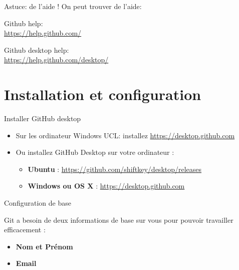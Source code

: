 \documentclass{beamer}
\begin{document}
\begin{frame}{Astuce: de l'aide !}
    On peut trouver de l'aide:
    
    \begin{center}
    	Github help:\\ \url{https://help.github.com/}
    \end{center}
    \begin{center}
        Github desktop help:\\ \url{https://help.github.com/desktop/}
    \end{center}
\end{frame}


\section{Installation et configuration}

\begin{frame}[label = {instal}]{Installer GitHub desktop}
\begin{itemize}
    \item Sur les ordinateur Windows UCL: installez
            \url{https://desktop.github.com}
    \item Ou installez GitHub Desktop sur votre ordinateur :
    \begin{itemize}
        \item \textbf{Ubuntu} : {\footnotesize{\url{https://github.com/shiftkey/desktop/releases}}}
        \item \textbf{Windows ou OS X} :
            \url{https://desktop.github.com}
    \end{itemize}
\end{itemize}
\end{frame}

\begin{frame}{Configuration de base}

Git a besoin de deux informations de base sur vous pour pouvoir travailler
efficacement :

\begin{itemize}
\item \textbf{Nom et Prénom}
\item \textbf{Email}
\end{itemize}

\end{frame}

%    
\end{document}
